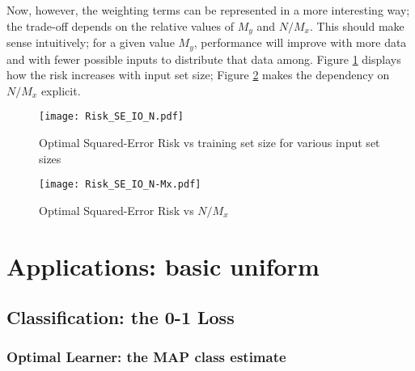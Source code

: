 \documentclass[12pt]{report}
\begin{document}
Now, however, the weighting terms can be represented in a more interesting way; the trade-off depends on the relative values of $M_y$ and $N/M_x$. This should make sense intuitively; for a given value $M_y$, performance will improve with more data and with fewer possible inputs to distribute that data among. Figure \ref{fig:Risk_SE_IO_N} displays how the risk increases with input set size; Figure \ref{fig:Risk_SE_IO_N-Mx} makes the dependency on $N/M_x$ explicit. 



\begin{figure}
\centering
\texttt{[image: Risk\_SE\_IO\_N.pdf]}
\caption{Optimal Squared-Error Risk vs training set size for various input set sizes}
\label{fig:Risk_SE_IO_N}
\end{figure}

\begin{figure}
\centering
\texttt{[image: Risk\_SE\_IO\_N-Mx.pdf]}
\caption{Optimal Squared-Error Risk vs $N/M_x$}
\label{fig:Risk_SE_IO_N-Mx}
\end{figure}
















\section{Applications: basic uniform}



\subsection{Classification: the 0-1 Loss} \label{sec:uniform_basic_apps_01}


\subsubsection{Optimal Learner: the MAP class estimate}
\end{document}
